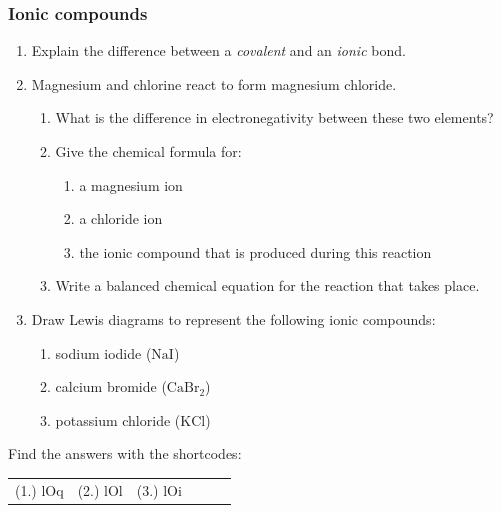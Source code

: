             \subsubsection{  Ionic compounds
        }
            \nopagebreak
        \label{m38684*id142562}\begin{enumerate}[noitemsep, label=\textbf{\arabic*}. ] 
            \label{m38684*uid57}\item Explain the difference between a \textsl{covalent} and an \textsl{ionic} bond.\newline
\label{m38684*uid58}\item Magnesium and chlorine react to form magnesium chloride.
\label{m38684*id142602}\begin{enumerate}[noitemsep, label=\textbf{\alph*}. ] 
            \label{m38684*uid59}\item What is the difference in electronegativity between these two elements?
\label{m38684*uid60}\item Give the chemical formula for:
\label{m38684*id142630}\begin{enumerate}[noitemsep, label=\textbf{\roman*}. ] 
            \label{m38684*uid61}\item a magnesium ion
\label{m38684*uid62}\item a chloride ion
\label{m38684*uid63}\item the ionic compound that is produced during this reaction
\end{enumerate}
        \label{m38684*uid64}\item Write a balanced chemical equation for the reaction that takes place.
\end{enumerate}
        \label{m38684*uid65}\item Draw Lewis diagrams to represent the following ionic compounds:
\label{m38684*id142697}\begin{enumerate}[noitemsep, label=\textbf{\alph*}. ] 
            \label{m38684*uid66}\item sodium iodide ($\mathrm{NaI}$)
\label{m38684*uid67}\item calcium bromide ($\mathrm{CaBr}{}_{2}$)
\label{m38684*uid68}\item potassium chloride ($\mathrm{KCl}$)
\end{enumerate}
        \end{enumerate}
      \label{m38684*uid69}
\par {} Find the answers with the shortcodes:
 \par \begin{tabular}[h]{cccccc}
 (1.) lOq  &  (2.) lOl  &  (3.) lOi  & \end{tabular}
